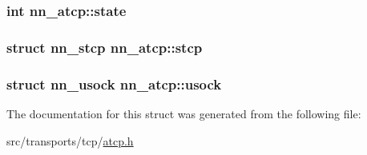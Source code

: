 \subsubsection[{state}]{\setlength{\rightskip}{0pt plus 5cm}int nn\+\_\+atcp\+::state}\hypertarget{structnn__atcp_ae28b649a99c4ae7f613d924dcdccc739}{}\label{structnn__atcp_ae28b649a99c4ae7f613d924dcdccc739}
\subsubsection[{stcp}]{\setlength{\rightskip}{0pt plus 5cm}struct {\bf nn\+\_\+stcp} nn\+\_\+atcp\+::stcp}\hypertarget{structnn__atcp_a523f49bc19d9da3b311cff626cec79ff}{}\label{structnn__atcp_a523f49bc19d9da3b311cff626cec79ff}
\subsubsection[{usock}]{\setlength{\rightskip}{0pt plus 5cm}struct {\bf nn\+\_\+usock} nn\+\_\+atcp\+::usock}\hypertarget{structnn__atcp_ad3d53b493bc19478dea4f8b0de9854c5}{}\label{structnn__atcp_ad3d53b493bc19478dea4f8b0de9854c5}


The documentation for this struct was generated from the following file\+:\begin{DoxyCompactItemize}
\item 
src/transports/tcp/\hyperlink{atcp_8h}{atcp.\+h}\end{DoxyCompactItemize}
